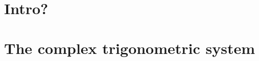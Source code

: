 \documentclass[british, oneside]{ntnuthesis}
\newif\ifSaveGit
\begin{document}

    \tableofcontents
    \printglossaries


    \ifSaveGit  
        \chapter{Lorum Intro}
            
    \else
        \chapter[]{Intro?}
            

        \chapter{The complex trigonometric system}
            
            
    \fi

%



    \printbibliography
\end{document}
